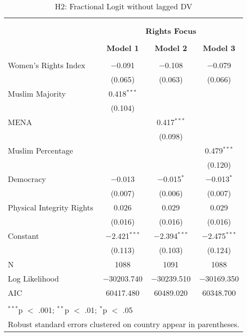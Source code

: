 
\begin{table}[!htbp] \centering 
  \caption{H2: Fractional Logit without lagged DV} 
  \label{} 
\begin{tabular}{@{\extracolsep{5pt}}lccc} 
\\[-1.8ex]\hline \\[-1.8ex] 
\\[-1.8ex] & \multicolumn{3}{c}{\textbf{Rights Focus}} \\ 
\\[-1.8ex] & \textbf{Model 1} & \textbf{Model 2} & \textbf{Model 3}\\ 
\hline \\[-1.8ex] 
 Women's Rights Index & $-$0.091 & $-$0.108 & $-$0.079 \\ 
  & (0.065) & (0.063) & (0.066) \\ 
  Muslim Majority & 0.418$^{***}$ &  &  \\ 
  & (0.104) &  &  \\ 
  MENA &  & 0.417$^{***}$ &  \\ 
  &  & (0.098) &  \\ 
  Muslim Percentage &  &  & 0.479$^{***}$ \\ 
  &  &  & (0.120) \\ 
  Democracy & $-$0.013 & $-$0.015$^{*}$ & $-$0.013$^{*}$ \\ 
  & (0.007) & (0.006) & (0.007) \\ 
  Physical Integrity Rights & 0.026 & 0.029 & 0.029 \\ 
  & (0.016) & (0.016) & (0.016) \\ 
  Constant & $-$2.421$^{***}$ & $-$2.394$^{***}$ & $-$2.475$^{***}$ \\ 
  & (0.113) & (0.103) & (0.124) \\ 
 N & 1088 & 1091 & 1088 \\ 
Log Likelihood & $-$30203.740 & $-$30239.510 & $-$30169.350 \\ 
AIC & 60417.480 & 60489.020 & 60348.700 \\ 
\hline \\[-1.8ex] 
\multicolumn{4}{l}{$^{***}$p $<$ .001; $^{**}$p $<$ .01; $^{*}$p $<$ .05} \\ 
\multicolumn{4}{l}{Robust standard errors clustered on country appear in parentheses.} \\ 
\end{tabular} 
\end{table} 
